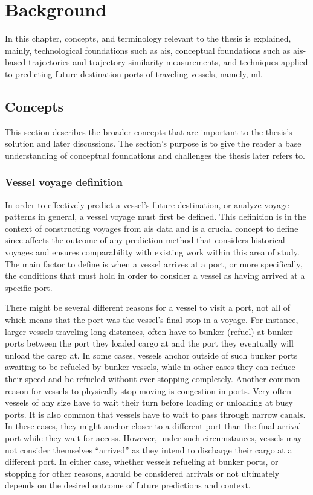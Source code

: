 \chapter{Background}

In this chapter, concepts, and terminology relevant to the thesis is explained, mainly, technological foundations such as \acrfull{ais}, conceptual foundations such as \acrshort{ais}-based trajectories and trajectory similarity measurements, and techniques applied to predicting future destination ports of traveling vessels, namely, \acrfull{ml}.

\section{Concepts}

This section describes the broader concepts that are important to the thesis's solution and later discussions. The section's purpose is to give the reader a base understanding of conceptual foundations and challenges the thesis later refers to.

\subsection{Vessel voyage definition}
\label{sec:vessel_voyage_definition}

In order to effectively predict a vessel's future destination, or analyze \gls{voyage} patterns in general, a vessel \gls{voyage} must first be defined. This definition is in the context of constructing voyages from \acrshort{ais} data and is a crucial concept to define since affects the outcome of any prediction method that considers historical voyages and ensures comparability with existing work within this area of study. The main factor to define is when a vessel arrives at a port, or more specifically, the conditions that must hold in order to consider a vessel as having arrived at a specific port.

There might be several different reasons for a vessel to visit a port, not all of which means that the port was the vessel's final stop in a voyage. For instance, larger vessels traveling long distances, often have to bunker (refuel) at bunker ports between the port they loaded cargo at and the port they eventually will unload the cargo at. In some cases, vessels anchor outside of such bunker ports awaiting to be refueled by bunker vessels, while in other cases they can reduce their speed and be refueled without ever stopping completely. Another common reason for vessels to physically stop moving is congestion in ports. Very often vessels of any size have to wait their turn before loading or unloading at busy ports. It is also common that vessels have to wait to pass through narrow canals. In these cases, they might anchor closer to a different port than the final arrival port while they wait for access. However, under such circumstances, vessels may not consider themselves ``arrived'' as they intend to discharge their cargo at a different port. In either case, whether vessels refueling at bunker ports, or stopping for other reasons, should be considered arrivals or not ultimately depends on the desired outcome of future predictions and context.

